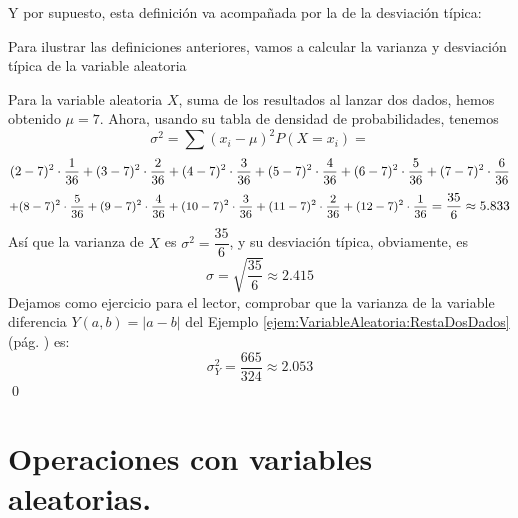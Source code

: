 Y por supuesto, esta definición va acompañada por la de la desviación típica:
    \begin{center}
    \end{center}
Para ilustrar las definiciones anteriores, vamos a calcular la varianza y desviación típica de la variable aleatoria
\begin{Ejemplo}
\label{cap04:ejem:varianzaVariableAleatoriaDiscreta}
Para la variable aleatoria $X$, suma de los resultados al lanzar dos dados, hemos obtenido $\mu=7$. Ahora, usando su tabla de densidad de probabilidades, tenemos
    \[\sigma^2=\sum (x_i-\mu)^2 P(X=x_i)=\]
    \[\mbox{\small $
    (2-7)^2\cdot\dfrac{1}{36}+(3-7)^2\cdot\dfrac{2}{36}+(4-7)^2\cdot\dfrac{3}{36}+(5-7)^2\cdot\dfrac{4}{36}+(6-7)^2\cdot\dfrac{5}{36}+(7-7)^2\cdot\dfrac{6}{36}$}\]
    \[\mbox{\small $
    +(8-7)^2\cdot\dfrac{5}{36}+(9-7)^2\cdot\dfrac{4}{36}+(10-7)^2\cdot\dfrac{3}{36}+(11-7)^2\cdot\dfrac{2}{36}
    +(12-7)^2\cdot\dfrac{1}{36}$}=\dfrac{35}{6}\approx 5.833\]
Así que la varianza de $X$ es $\sigma^2=\dfrac{35}{6}$, y su desviación típica, obviamente, es \[\sigma=\sqrt{\dfrac{35}{6}}\approx 2.415\]
Dejamos como ejercicio para el lector, comprobar que la varianza de la variable diferencia $Y(a,b)=|a-b|$ del Ejemplo \ref{ejem:VariableAleatoria:RestaDosDados} (pág. \pageref{ejem:VariableAleatoria:RestaDosDados}) es:
\[\sigma^2_Y=\dfrac{665}{324}\approx 2.053\]
\qed
\end{Ejemplo}

\section{Operaciones con variables aleatorias.}
\label{sec:OperacionesVariablesAleatorias}

